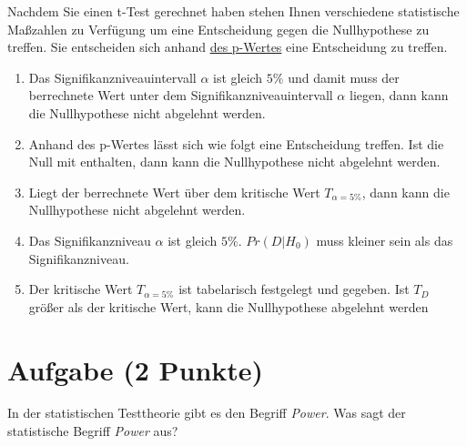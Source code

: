 \documentclass[a4paper, 9pt]{scrartcl}\usepackage[]{graphicx}\usepackage[]{xcolor}
\begin{document}
Nachdem Sie einen t-Test gerechnet haben stehen Ihnen verschiedene statistische Maßzahlen zu Verfügung um eine Entscheidung gegen die Nullhypothese zu treffen. Sie entscheiden sich anhand \underline{des p-Wertes} eine Entscheidung zu treffen.





\begin{enumerate}
\item [\textbf{A} \msquare] Das Signifikanzniveauintervall $\alpha$ ist gleich $5\%$ und damit muss der berrechnete Wert unter dem Signifikanzniveauintervall $\alpha$ liegen, dann kann die Nullhypothese nicht abgelehnt werden.
\item [\textbf{B} \msquare] Anhand des p-Wertes lässt sich wie folgt eine Entscheidung treffen. Ist die Null mit enthalten, dann kann die Nullhypothese nicht abgelehnt werden.
\item [\textbf{C} \msquare] Liegt der berrechnete Wert über dem kritische Wert $T_{\alpha = 5\%}$, dann kann die Nullhypothese nicht abgelehnt werden.
\item [\textbf{D} \msquare] Das Signifikanzniveau $\alpha$ ist gleich $5\%$. $Pr(D|H_0)$ muss kleiner sein als das Signifikanzniveau.
\item [\textbf{E} \msquare] Der kritische Wert $T_{\alpha = 5\%}$ ist tabelarisch festgelegt und gegeben. Ist $T_{D}$ größer als der kritische Wert, kann die Nullhypothese abgelehnt werden
\end{enumerate}

\section{Aufgabe \hfill (2 Punkte)}

\ifcollection
\begin{flushright}
\tiny\vspace{-2Ex}
\textbf{\examinhaltstart}
\exammodulebiostat
\vspace{-1Ex}
\end{flushright}
\fi




In der statistischen Testtheorie gibt es den Begriff \textit{Power}. Was sagt der statistische Begriff \textit{Power} aus?
\end{document}
